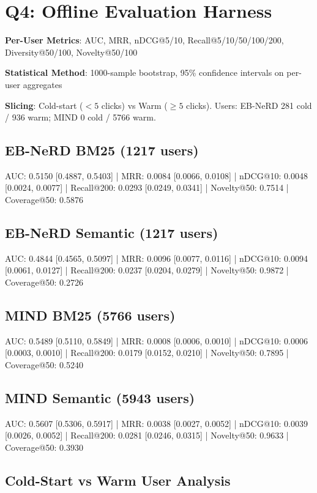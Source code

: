 \documentclass[11pt,a4paper]{article}
\begin{document}
\section*{Q4: Offline Evaluation Harness}

\textbf{Per-User Metrics}: AUC, MRR, nDCG@5/10, Recall@5/10/50/100/200, Diversity@50/100, Novelty@50/100

\textbf{Statistical Method}: 1000-sample bootstrap, 95\% confidence intervals on per-user aggregates

\textbf{Slicing}: Cold-start ($<5$ clicks) vs Warm ($\geq 5$ clicks). Users: EB-NeRD 281 cold / 936 warm; MIND 0 cold / 5766 warm.

\subsection*{EB-NeRD BM25 (1217 users)}
AUC: 0.5150 [0.4887, 0.5403] | MRR: 0.0084 [0.0066, 0.0108] | nDCG@10: 0.0048 [0.0024, 0.0077] | Recall@200: 0.0293 [0.0249, 0.0341] | Novelty@50: 0.7514 | Coverage@50: 0.5876

\subsection*{EB-NeRD Semantic (1217 users)}
AUC: 0.4844 [0.4565, 0.5097] | MRR: 0.0096 [0.0077, 0.0116] | nDCG@10: 0.0094 [0.0061, 0.0127] | Recall@200: 0.0237 [0.0204, 0.0279] | Novelty@50: 0.9872 | Coverage@50: 0.2726

\subsection*{MIND BM25 (5766 users)}
AUC: 0.5489 [0.5110, 0.5849] | MRR: 0.0008 [0.0006, 0.0010] | nDCG@10: 0.0006 [0.0003, 0.0010] | Recall@200: 0.0179 [0.0152, 0.0210] | Novelty@50: 0.7895 | Coverage@50: 0.5240

\subsection*{MIND Semantic (5943 users)}
AUC: 0.5607 [0.5306, 0.5917] | MRR: 0.0038 [0.0027, 0.0052] | nDCG@10: 0.0039 [0.0026, 0.0052] | Recall@200: 0.0281 [0.0246, 0.0315] | Novelty@50: 0.9633 | Coverage@50: 0.3930

\subsection*{Cold-Start vs Warm User Analysis}
\end{document}
